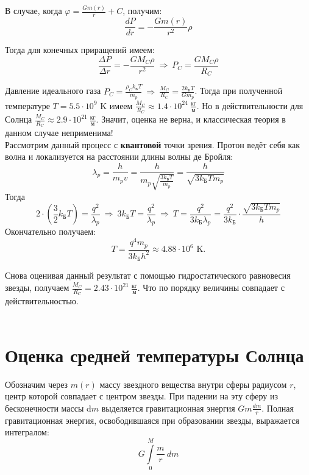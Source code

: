 \documentclass[a4paper,12pt]{article}
\begin{document}
В случае, когда $\varphi = \frac{Gm(r)}{r} + C$, получим:
\[
\frac{dP}{dr} = -\frac{Gm(r)}{r^2}\rho
\]

Тогда для конечных приращений имеем:
\[
\frac{\Delta P}{\Delta r} = -\frac{GM_C\rho}{r^2}\ \Rightarrow\ P_C = \frac{GM_C\rho}{R_C}
\]

Давление идеального газа $P_C = \frac{\rho_Ck_{\text{Б}}T}{m_p}\ \Rightarrow\ \frac{M_C}{R_C} = \frac{2k_{\text{Б}}T}{Gm_p}$. Тогда при полученной температуре $T = 5.5\cdot 10^9\text{ K}$ имеем $\frac{M_C}{R_C} \approx 1.4\cdot10^{24}\ \frac{\text{кг}}{\text{м}}$. Но в действительности для Солнца $\frac{M_C}{R_C} \approx 2.9\cdot10^{21}\ \frac{\text{кг}}{\text{м}}$. Значит, оценка не верна, и классическая теория в данном случае неприменима!\\

Рассмотрим данный процесс с \textbf{квантовой} точки зрения. Протон
ведёт себя как волна и локализуется на расстоянии длины волны де Бройля:
\[
\lambda_p = \frac{h}{m_pv} = \frac{h}{m_p\sqrt{\frac{3k_{\text{Б}}T}{m_p}}} = \frac{h}{\sqrt{3k_{\text{Б}}Tm_p}}
\]
Тогда 
\[
2\cdot\left(\frac{3}{2}k_{\text{Б}}T\right) = \frac{q^2}{\lambda_p}\ \Rightarrow\ 3k_{\text{Б}}T = \frac{q^2}{\lambda_p}\ \Rightarrow\ T = \frac{q^2}{3k_{\text{Б}}\lambda_p} = \frac{q^2}{3k_{\text{Б}}}\cdot\frac{\sqrt{3k_{\text{Б}}Tm_p}}{h}
\]
Окончательно получаем:
\[
T = \frac{q^4m_p}{3k_{\text{Б}}h^2} \approx 4.88\cdot10^6\text{ K}.
\]

Снова оценивая данный результат с помощью гидростатического равновесия звезды, получаем $\frac{M_C}{R_C} = 2.43\cdot10^{21}\ \frac{\text{кг}}{\text{м}}$. Что по порядку величины совпадает с действительностью.\\\\

\section*{Оценка средней температуры Солнца}

Обозначим через $m(r)$ массу звездного вещества внутри сферы радиусом $r$, центр которой совпадает с центром звезды. При падении на эту сферу из бесконечности массы d$m$ выделяется гравитационная энергия $Gm\frac{dm}{r}$. Полная гравитационная энергия, освободившаяся при образовании звезды, выражается интегралом:
\[
G\int\limits_0^M\frac{m}{r}\ dm
\]
\end{document}
